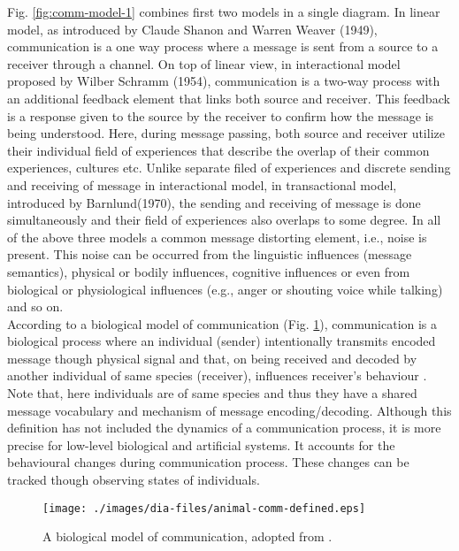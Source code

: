 Fig. \ref{fig:comm-model-1} combines first two models in a single diagram. In linear model, as introduced by Claude Shanon and Warren Weaver (1949), communication is a one way process where a message is sent from a source to a receiver through a channel. On top of linear view, in interactional model proposed by Wilber Schramm (1954), communication is a two-way process with an additional feedback element  that links both source and receiver. This feedback is a response given to the source by the receiver to confirm how the message is being understood. Here, during message passing, both source and receiver utilize their individual field of experiences that describe the overlap of their common experiences, cultures etc. Unlike separate filed of experiences and discrete sending and receiving of message in interactional model, in transactional model, introduced by Barnlund(1970), the sending and receiving of message is done simultaneously and their  field of experiences also overlaps to some degree. In all of the above three models a common message distorting element, i.e., noise is present. This noise can be occurred from the linguistic influences (message semantics),  physical or bodily influences, cognitive influences or even from biological
or physiological influences (e.g., anger or shouting voice while talking) and so on.\\
According to a biological model of communication (Fig. \ref{fig:bio-comm-defined}), communication is a biological process where an  individual (sender) intentionally transmits encoded message though physical signal and that, on being received and decoded by another individual of same species (receiver), influences receiver's behaviour \cite{Frings1997}. Note that, here individuals are of same species and thus they have a  shared message vocabulary and mechanism of message encoding/decoding. Although  this definition has not included the dynamics of a communication process, it is more precise for low-level biological and artificial systems. It accounts for the behavioural changes during communication process. These changes can be tracked though observing states of individuals.\\   
\begin{figure}
\centering
\texttt{[image: ./images/dia-files/animal-comm-defined.eps]}
\caption{ A biological model of communication, adopted from \protect{}.}
\label{fig:bio-comm-defined} 
\end{figure}
